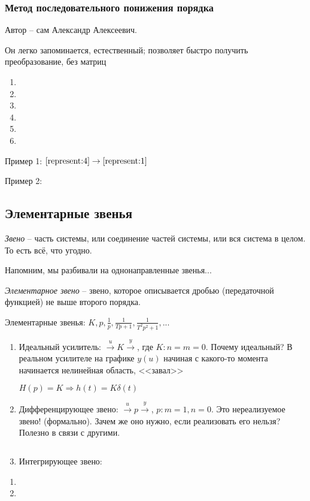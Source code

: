 \documentclass[main.tex]{subfiles}
\begin{document}
\subsubsection{ Метод последовательного понижения порядка }
Автор -- сам Александр Алексеевич.

Он легко запоминается, естественный; позволяет быстро получить преобразование, без матриц

\begin{enumerate}[noitemsep]
	\item
	\item
	\item
	\item
	\item
	\item
\end{enumerate}

Пример 1: $ \ref{represent:4} \to \ref{represent:1} $ %

Пример 2:



\subsection{Элементарные звенья}

\emph{Звено} -- часть системы, или соединение частей системы, или вся система в целом.
То есть всё, что угодно.

Напомним, мы разбивали на однонаправленные звенья...

\emph{Элементарное звено} -- звено, которое описывается дробью (передаточной функцией) не выше второго порядка.

Элементарные звенья: $ K, p, \frac{1}{p}, \frac{1}{Tp+1}, \frac{1}{T^2p^2 + 1}, ... $

\begin{enumerate}[noitemsep]
	\item Идеальный усилитель: $ \xrightarrow{u} \boxed{K} \xrightarrow{y} $, где $ K: n=m=0 $.
	Почему идеальный? В реальном усилителе на графике $ y(u) $ начиная с какого-то момента начинается нелинейная область, <<завал>>

	$ H(p) = K \Rightarrow h(t) = K \delta(t) $

	\item Дифференцирующее звено: $ \xrightarrow{u} \boxed{p} \xrightarrow{y} $, $ p: m=1, n=0 $. Это нереализуемое звено! (формально).
	Зачем же оно нужно, если реализовать его нельзя?
	Полезно в связи с другими.

	$  $ %

	\item Интегрирующее звено:
\end{enumerate}

\begin{enumerate}[noitemsep]
	\item
	\item
\end{enumerate}
\end{document}
